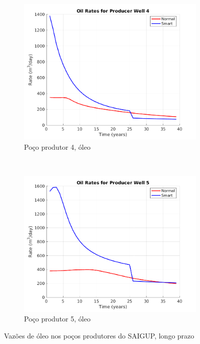 \begin{figure}[!ht]
	\begin{subfigure}[b]{.3\textwidth}
		\includegraphics[width=\textwidth]{figs/resultadosLSAIGUP/LSAIGUP_OilWell4_Zoom}
		\caption{Po\c{c}o produtor 4, \'{o}leo}
		\label{LSAIGUP_OilWell4}
	\end{subfigure}
	~
	\begin{subfigure}[b]{.3\textwidth}
		\includegraphics[width=\textwidth]{figs/resultadosLSAIGUP/LSAIGUP_OilWell5_Zoom}
		\caption{Po\c{c}o produtor 5, \'{o}leo}
		\label{LSAIGUP_OilWell5}
	\end{subfigure}
	\caption{Vaz\~{o}es de \'{o}leo nos po\c{c}os produtores do SAIGUP, longo prazo}
	\label{LSAIGUP_OilRates}
\end{figure}

